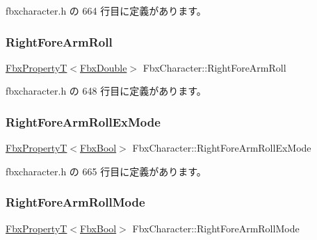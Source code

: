  fbxcharacter.\+h の 664 行目に定義があります。

\mbox{\label{class_fbx_character_ae212ac3d99f7c69142bb4abc561c1c99}} 
\subsubsection{\texorpdfstring{Right\+Fore\+Arm\+Roll}{RightForeArmRoll}}
{\footnotesize\ttfamily \hyperlink{class_fbx_property_t}{Fbx\+PropertyT}$<$\hyperlink{fbxtypes_8h_a171e72a1c46fc15c1a6c9c31948c1c5b}{Fbx\+Double}$>$ Fbx\+Character\+::\+Right\+Fore\+Arm\+Roll}



 fbxcharacter.\+h の 648 行目に定義があります。

\mbox{\label{class_fbx_character_a49775ba6e1428e6be008feeeed7cc516}} 
\subsubsection{\texorpdfstring{Right\+Fore\+Arm\+Roll\+Ex\+Mode}{RightForeArmRollExMode}}
{\footnotesize\ttfamily \hyperlink{class_fbx_property_t}{Fbx\+PropertyT}$<$\hyperlink{fbxtypes_8h_a92e0562b2fe33e76a242f498b362262e}{Fbx\+Bool}$>$ Fbx\+Character\+::\+Right\+Fore\+Arm\+Roll\+Ex\+Mode}



 fbxcharacter.\+h の 665 行目に定義があります。

\mbox{\label{class_fbx_character_ada8eaa6dbd3161bfbb6a057116364d55}} 
\subsubsection{\texorpdfstring{Right\+Fore\+Arm\+Roll\+Mode}{RightForeArmRollMode}}
{\footnotesize\ttfamily \hyperlink{class_fbx_property_t}{Fbx\+PropertyT}$<$\hyperlink{fbxtypes_8h_a92e0562b2fe33e76a242f498b362262e}{Fbx\+Bool}$>$ Fbx\+Character\+::\+Right\+Fore\+Arm\+Roll\+Mode}



